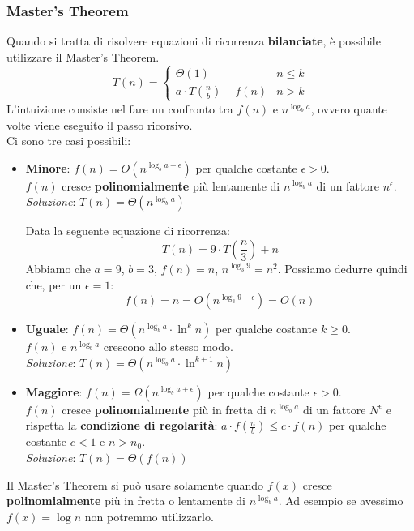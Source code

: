 \subsubsection{Master's Theorem}
Quando si tratta di risolvere equazioni di ricorrenza \textbf{bilanciate}, è possibile utilizzare il Master's Theorem. \\
\begin{equation}
	T(n)=\begin{cases}
		\Theta(1) & n \leq k \\
		a \cdot T(\frac{n}{b}) + f(n) & n >k
	\end{cases}
\end{equation}
L'intuizione consiste nel fare un confronto tra $f(n)$ e $n^{\log_b{a}}$, ovvero quante volte viene eseguito il passo ricorsivo. \\
Ci sono tre casi possibili:
\begin{itemize}
	\item \textbf{Minore}: $f(n) = O(n^{\log_b{a}-\epsilon})$ per qualche costante $\epsilon > 0$. \\ $f(n)$ cresce \textbf{polinomialmente} più lentamente di $n^{\log_b{a}}$ di un fattore $n^\epsilon$. \\
	\emph{Soluzione}: $T(n) = \Theta(n^{\log_b{a}})$ \\
	\begin{example}
		Data la seguente equazione di ricorrenza:
		\begin{equation}
			T(n) = 9 \cdot T(\frac{n}{3}) + n
		\end{equation}
		Abbiamo che $a=9$, $b=3$, $f(n) = n$, $n^{\log_3 9} = n^2$. Possiamo dedurre quindi che, per un $\epsilon = 1$:
		\begin{equation}
			f(n)  = n = O(n^{\log_3 9 - \epsilon}) = O(n)
		\end{equation}
	\end{example}
	\item \textbf{Uguale}: $f(n) = \Theta(n^{\log_b{a}}\cdot \ln^k{n})$ per qualche costante $k \geq 0$. \\ $f(n)$ e $n^{\log_b{a}}$ crescono allo stesso modo. \\
	\emph{Soluzione}: $T(n) = \Theta(n^{\log_b{a}} \cdot \ln^{k+1}{n})$
	\item \textbf{Maggiore}: $f(n) = \Omega(n^{\log_b{a} + \epsilon})$ per qualche costante $\epsilon > 0$. \\ $f(n)$ cresce \textbf{polinomialmente} più in fretta di $n^{\log_b{a}}$ di un fattore $N^\epsilon$ e rispetta la \textbf{condizione di regolarità}: $a \cdot f(\frac{n}{b}) \leq c \cdot f(n)$ per qualche costante $c<1$ e $n > n_0$. \\
	\emph{Soluzione}: $T(n) = \Theta(f(n))$
\end{itemize}
\begin{observation}
	Il Master's Theorem si può usare solamente quando $f(x)$ cresce \textbf{polinomialmente} più in fretta o lentamente di $n^{\log_b{a}}$. Ad esempio se avessimo $f(x) = \log{n}$ non potremmo utilizzarlo.
\end{observation}